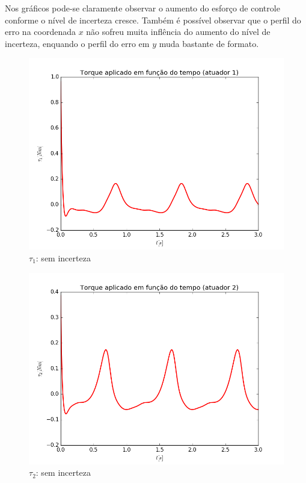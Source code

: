 \documentclass[]{politex}
\begin{document}
Nos gráficos pode-se claramente observar o aumento do esforço de controle conforme o nível de incerteza cresce. Também é possível observar que o perfil do erro na coordenada $x$ não sofreu muita inflência do aumento do nível de incerteza, enquando o perfil do erro em $y$ muda bastante de formato.

\newpage

\begin{multicols}{2}
\begin{figure}[H]
	\centering
	\includegraphics[scale=0.42]{imagens/tau1_0.png}  
	\caption{$\tau_1$: sem incerteza}
	\label{fig:Torque1_0}
\end{figure}
\begin{figure}[H]
	\centering
	\includegraphics[scale=0.42]{imagens/tau2_0.png}  
	\caption{$\tau_2$: sem incerteza}
	\label{fig:Torque2_0}
\end{figure}
\end{multicols}
\end{document}
